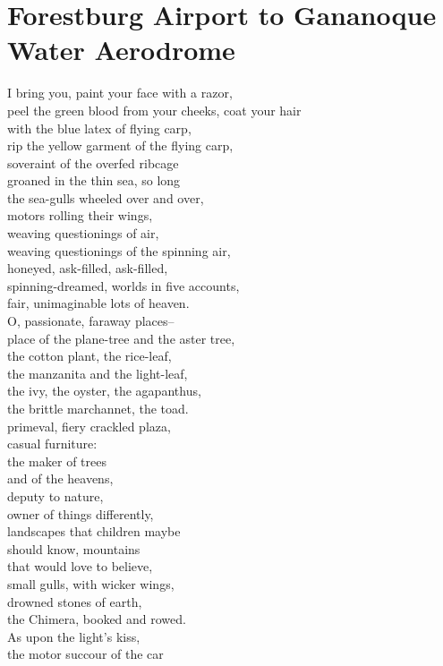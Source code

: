\documentclass[smalldemyvopaper,11pt,twoside,onecolumn,openright,extrafontsizes]{memoir}
\begin{document}
\chapter{Forestburg Airport to Gananoque Water Aerodrome}
I bring you, paint your face with a razor,
\\peel the green blood from your cheeks, coat your hair
\\with the blue latex of flying carp,
\\rip the yellow garment of the flying carp,
\\soveraint of the overfed ribcage
\\groaned in the thin sea, so long
\\the sea-gulls wheeled over and over,
\\motors rolling their wings,
\\weaving questionings of air,
\\weaving questionings of the spinning air,
\\honeyed, ask-filled, ask-filled,
\\spinning-dreamed, worlds in five accounts,
\\fair, unimaginable lots of heaven.
\\O, passionate, faraway places--
\\place of the plane-tree and the aster tree,
\\the cotton plant, the rice-leaf,
\\the manzanita and the light-leaf,
\\the ivy, the oyster, the agapanthus,
\\the brittle marchannet, the toad.
\\primeval, fiery crackled plaza,
\\casual furniture:
\\the maker of trees
\\and of the heavens,
\\deputy to nature,
\\owner of things differently,
\\landscapes that children maybe
\\should know, mountains
\\that would love to believe,
\\small gulls, with wicker wings,
\\drowned stones of earth,
\\the Chimera, booked and rowed.
\\As upon the light's kiss,
\\the motor succour of the car
\end{document}
